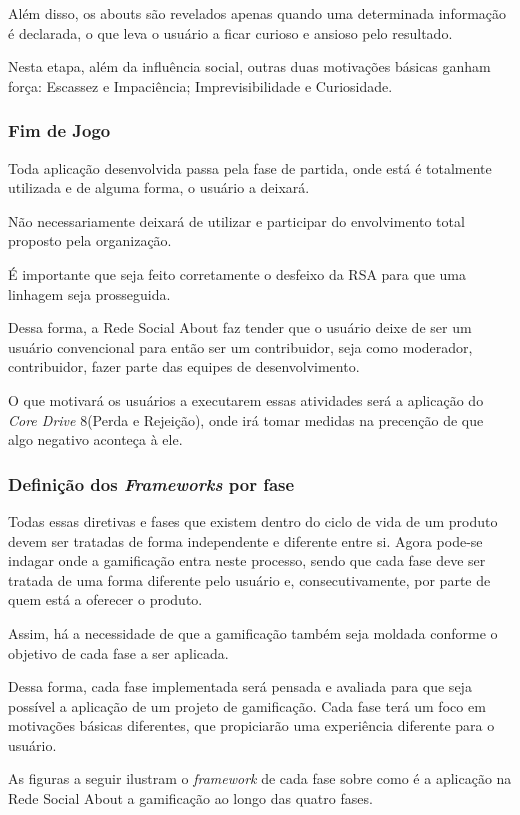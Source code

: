 Além disso, os abouts são revelados apenas quando uma determinada informação
é declarada, o que leva o usuário a ficar curioso e ansioso pelo resultado. 

Nesta etapa, além da influência social, outras duas motivações básicas ganham 
força: Escassez e Impaciência; Imprevisibilidade e Curiosidade.

\subsubsection{Fim de Jogo}
\label{sub:fim_de_jogo}
Toda aplicação desenvolvida passa pela fase de partida, onde está é totalmente utilizada
e de alguma forma, o usuário a deixará. 

Não necessariamente deixará de utilizar e participar do envolvimento total proposto pela
organização.

É importante que seja feito corretamente o desfeixo da RSA para que uma linhagem seja
prosseguida.

Dessa forma, a Rede Social About faz tender que o usuário deixe de ser um usuário
convencional para então ser um contribuidor,  seja como moderador, contribuidor,
fazer parte das equipes de desenvolvimento.

O que motivará os usuários a executarem essas atividades será a aplicação 
do \textit{Core Drive} 8(Perda e Rejeição), onde  irá tomar medidas na precenção de
que algo negativo aconteça à ele.


\subsubsection{Definição dos \textit{Frameworks} por fase}
\label{sub:fim_de_jogo}
Todas essas diretivas e fases que existem dentro do ciclo de vida de um produto devem ser
tratadas de forma independente e diferente entre si. Agora pode-se indagar onde a gamificação
entra neste processo, sendo que cada fase deve ser tratada de uma forma diferente pelo
usuário e, consecutivamente, por parte de quem está a oferecer o produto.

Assim, há a necessidade de que a gamificação também seja moldada conforme o objetivo de
cada fase a ser aplicada.

Dessa forma, cada fase implementada será pensada e avaliada para que seja possível a
aplicação de um  projeto de gamificação. Cada fase terá um foco em motivações
básicas diferentes, que propiciarão uma experiência diferente para o usuário.

As figuras a seguir ilustram o \textit{framework} de cada fase sobre como é a aplicação na
Rede Social About a gamificação ao longo das quatro fases.

